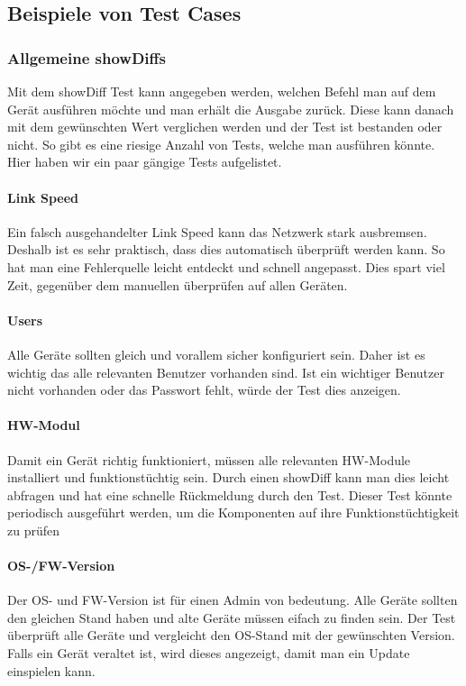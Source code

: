 \documentclass[a4,12pt]{scrartcl}
\begin{document}
\subsection{Beispiele von Test Cases}
\subsubsection{Allgemeine showDiffs}
Mit dem showDiff Test kann angegeben werden, welchen Befehl man auf dem Gerät ausführen möchte und man erhält die Ausgabe zurück. Diese kann danach mit dem gewünschten Wert verglichen werden und der Test ist bestanden oder nicht.
So gibt es eine riesige Anzahl von Tests, welche man ausführen könnte. Hier haben wir ein paar gängige Tests aufgelistet.
\paragraph{Link Speed}\newline
Ein falsch ausgehandelter Link Speed kann das Netzwerk stark ausbremsen. Deshalb ist es sehr praktisch, dass dies automatisch überprüft werden kann. So hat man eine Fehlerquelle leicht entdeckt und schnell angepasst. Dies spart viel Zeit, gegenüber dem manuellen überprüfen auf allen Geräten.
\paragraph{Users}\newline
Alle Geräte sollten gleich und vorallem sicher konfiguriert sein. Daher ist es wichtig das alle relevanten Benutzer vorhanden sind. Ist ein wichtiger Benutzer nicht vorhanden oder das Passwort fehlt, würde der Test dies anzeigen.
\paragraph{HW-Modul}\newline
Damit ein Gerät richtig funktioniert, müssen alle relevanten HW-Module installiert und funktionstüchtig sein. Durch einen showDiff kann man dies leicht abfragen und hat eine schnelle Rückmeldung durch den Test. Dieser Test könnte periodisch ausgeführt werden, um die Komponenten auf ihre Funk­ti­ons­tüch­tig­keit zu prüfen
\paragraph{OS-/FW-Version}\newline
Der OS- und FW-Version ist für einen Admin von bedeutung. Alle Geräte sollten den gleichen Stand haben und alte Geräte müssen eifach zu finden sein. Der Test überprüft alle Geräte und vergleicht den OS-Stand mit der gewünschten Version. Falls ein Gerät veraltet ist, wird dieses angezeigt, damit man ein Update einspielen kann.
\end{document}
